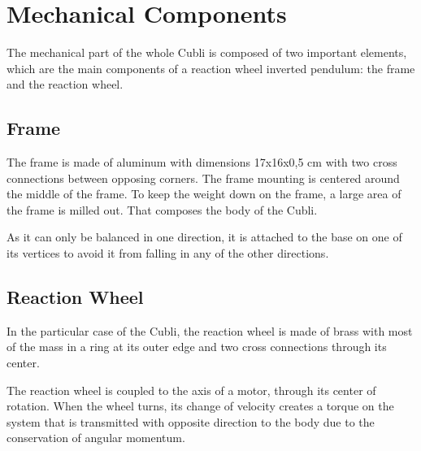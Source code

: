 \section{Mechanical Components}
The mechanical part of the whole Cubli is composed of two important elements, which are the main components of a reaction wheel inverted pendulum: the frame and the reaction wheel.

\subsection{Frame}
The frame is made of aluminum with dimensions 17x16x0,5 \si{cm}  with two cross connections between opposing corners. The frame mounting is centered around the middle of the frame.
To keep the weight down on the frame, a large area of the frame is milled out. That composes the body of the Cubli. 

As it can only be balanced in one direction, it is attached to the base on one of its vertices to avoid it from falling in any of the other directions.


\subsection{Reaction Wheel}
In the particular case of the Cubli, the reaction wheel is made of brass with most of the mass in a ring at its outer edge and two cross connections through its center.

The reaction wheel is coupled to the axis of a motor, through its center of rotation. When the wheel turns, its change of velocity creates a torque on the system that is transmitted with opposite direction to the body due to the conservation of angular momentum.